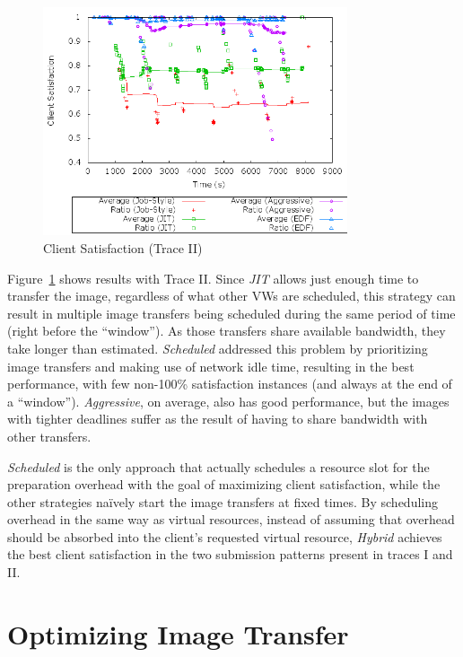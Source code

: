 \documentclass[singlespace]{ccw_chithesis}
\begin{document}
\begin{figure}
  \begin{center}
    \includegraphics[width=0.8\textwidth]{figures/ClientSatisfaction-ClusteredStartTimes.png}
    \caption{Client Satisfaction (Trace II)}
	\label{fig:clientsatisfactionII}
  \end{center}
\end{figure}

Figure~\ref{fig:clientsatisfactionII} shows results with Trace II. Since \emph{JIT} allows just
enough time to transfer the image, regardless of what other VWs are
scheduled, this strategy can result in multiple image transfers being
scheduled during the same period of time (right before the ``window'').
As those transfers share available bandwidth, they take longer than
estimated. \emph{Scheduled} addressed this problem by prioritizing image
transfers and making use of network idle time, resulting in the best
performance, with few non{}-100\% satisfaction instances (and always at
the end of a ``window''). \emph{Aggressive}, on average, also has
good performance, but the images with tighter deadlines suffer as the
result of having to share bandwidth with other transfers.

\emph{Scheduled} is the only approach that
actually schedules a resource slot for the preparation overhead with
the goal of maximizing client satisfaction, while the other strategies
na\"ively start the image transfers at fixed times. By scheduling
overhead in the same way as virtual resources, instead of assuming that
overhead should be absorbed into the client's requested virtual
resource, \emph{Hybrid} achieves the best client satisfaction in the
two submission patterns present in traces I and II.

\section{Optimizing Image Transfer}
\end{document}
